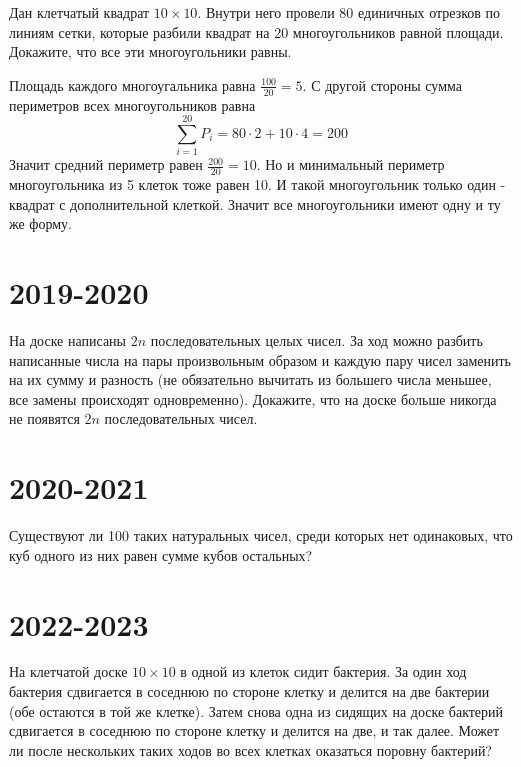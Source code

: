 \documentclass[11pt, a4paper]{template}
\begin{document}
\begin{exercise}
Дан клетчатый квадрат $10 \times 10$. Внутри него провели 80 единичных отрезков по линиям сетки, которые разбили квадрат на 20 многоугольников равной площади. Докажите, что все эти многоугольники равны.
\end{exercise}

\begin{solution}
Площадь каждого многоугальника равна $\frac{100}{20} = 5$. С другой стороны сумма периметров всех многоугольников равна
$$
\sum_{i=1}^{20} P_{i} = 80 \cdot 2 + 10 \cdot 4 = 200
$$
Значит средний периметр равен $\frac{200}{20} = 10$. Но и минимальный периметр многоугольника из 5 клеток тоже равен 10. И такой многоугольник только один - квадрат с дополнительной клеткой. Значит все многоугольники имеют одну и ту же форму.
\end{solution}

\chapter{2019-2020}

\begin{exercise}
На доске написаны $2n$ последовательных целых чисел. За ход можно разбить написанные числа на пары \newline произвольным образом и каждую пару чисел заменить на их сумму и разность (не обязательно вычитать из большего числа меньшее, все замены происходят одновременно). Докажите, что на доске больше никогда не появятся $2n$ последовательных чисел.
\end{exercise}

\chapter{2020-2021}

\begin{exercise}
Существуют ли 100 таких натуральных чисел, среди которых нет одинаковых, что куб одного из них равен сумме кубов остальных?
\end{exercise}

\chapter{2022-2023}

\begin{exercise}
На клетчатой доске $10 \times 10$ в одной из клеток сидит бактерия. За один ход бактерия сдвигается в соседнюю по стороне клетку и делится на две бактерии (обе остаются в той же клетке). Затем снова одна из сидящих на доске бактерий сдвигается в соседнюю по стороне клетку и делится на две, и так далее. Может ли после нескольких таких ходов во всех клетках оказаться поровну бактерий?
\end{exercise}
\end{document}
